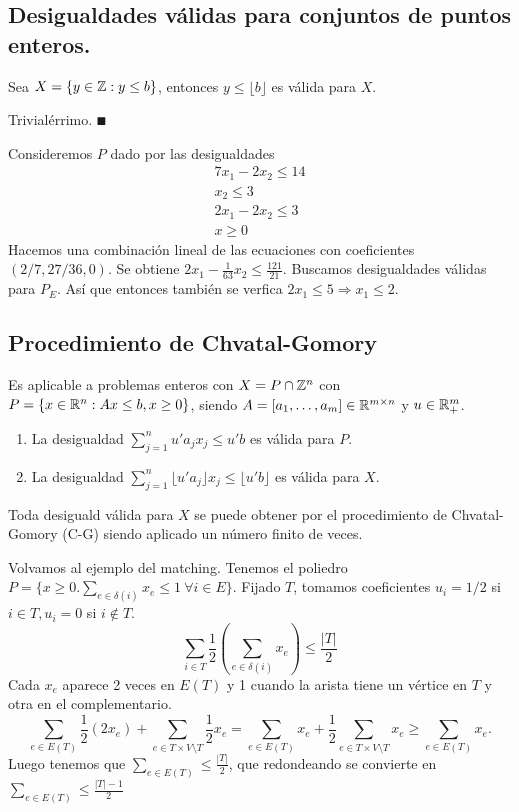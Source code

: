 \documentclass[MIOP.tex]{subfiles}
\begin{document}
\subsection{Desigualdades válidas para conjuntos de puntos enteros.}
\begin{prop}
Sea $X=\{y\in\mathbb{Z}:y\leq b\}$, entonces $y\leq\lfloor b\rfloor$ es válida para $X$.
\end{prop}
\begin{dem}
Trivialérrimo. $\QED$
\end{dem}
\begin{ej}
Consideremos $P$ dado por las desigualdades
\begin{align*}
7x_1-2x_2\leq 14\\
x_2\leq 3\\
2x_1-2x_2\leq 3\\
x\geq 0
\end{align*}
Hacemos una combinación lineal de las ecuaciones con coeficientes $(2/7,27/36, 0)$. Se obtiene $2x_1-\frac{1}{63}x_2\leq\frac{121}{21}$. Buscamos desigualdades válidas para $P_E$. Así que entonces también se verfica $2x_1\leq 5\Rightarrow x_1\leq 2$.
\end{ej}

\subsection{Procedimiento de Chvatal-Gomory}
Es aplicable a problemas enteros con $X=P\cap\mathbb{Z}^n$ con $P=\{x\in\mathbb{R}^n:Ax\leq b,x\geq 0\}$, siendo $A=[a_1,\dots,a_m]\in\mathbb{R}^{m\times n}$ y $u\in\mathbb{R}^m_+$. 
\begin{enumerate}
\item La desigualdad $\sum_{j=1}^nu'a_jx_j\leq u'b$ es válida para $P$.
\item La desigualdad $\sum_{j=1}^n\lfloor u'a_j\rfloor x_j\leq \lfloor u'b\rfloor$ es válida para $X$.
\end{enumerate}
\begin{teorema}
Toda desiguald válida para $X$ se puede obtener por el procedimiento de Chvatal-Gomory (C-G) siendo aplicado un número finito de veces.
\end{teorema}
\begin{ej}
Volvamos al ejemplo del matching. Tenemos el poliedro $P=\{x\geq 0.\sum_{e\in\delta(i)}x_e\leq 1\ \forall i\in E\}$. Fijado $T$, tomamos coeficientes $u_i=1/2$ si $i\in T, u_i=0$ si $i\notin T$. 
$$\sum_{i\in T}\frac{1}{2}(\sum_{e\in\delta(i)}x_e)\leq\frac{|T|}{2}$$
Cada $x_e$ aparece 2 veces en $E(T)$ y 1 cuando la arista tiene un vértice en $T$ y otra en el complementario.
$$\sum_{e\in E(T)}\frac{1}{2}(2x_e)+\sum_{e\in T\times V\setminus T}\frac{1}{2}x_e=\sum_{e\in E(T)}x_e+\frac{1}{2}\sum_{e\in T\times V\setminus T}x_e\geq \sum_{e\in E(T)}x_e.$$
Luego tenemos que $\sum_{e\in E(T)}\leq\frac{|T|}{2}$, que redondeando se convierte en $\sum_{e\in E(T)}\leq\frac{|T|-1}{2}$ 

\end{ej}
\end{document}
